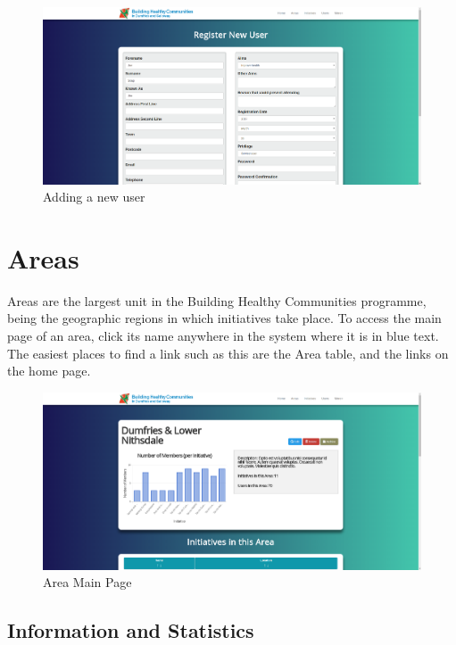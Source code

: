 \documentclass{bhcguides}
\begin{document}
\begin{figure}[h!]
 \centerline{\includegraphics[width=\textwidth, height=\textheight, keepaspectratio]{newuser.png}}
 \caption{Adding a new user}
 \label{fig:newUser}
\end{figure}

\clearpage

\section{Areas}
\label{sec:areas}

Areas are the largest unit in the Building Healthy Communities programme, being the geographic regions in which initiatives take place. To access the main page of an area, click its name anywhere in the system where it is in blue text. The easiest places to find a link such as this are the Area table, and the links on the home page.

\begin{figure}[h]
 \centerline{\includegraphics[width=\textwidth, height=\textheight, keepaspectratio]{areamainpage.png}}
 \caption{Area Main Page}
 \label{fig:areaMainPage}
\end{figure}

\subsection{Information and Statistics}
\label{ssec:areainfoandstats}
\end{document}
